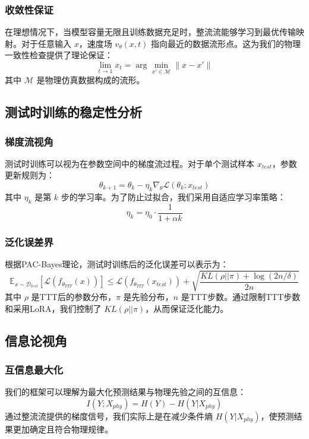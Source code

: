 \documentclass[12pt, a4paper]{article}
\begin{document}
\subsubsection{收敛性保证}
在理想情况下，当模型容量无限且训练数据充足时，整流流能够学习到最优传输映射。对于任意输入 $x$，速度场 $v_\theta(x,t)$ 指向最近的数据流形点。这为我们的物理一致性检查提供了理论保证：
\begin{equation}
\lim_{t \rightarrow 1} x_t = \arg\min_{x' \in \mathcal{M}} \|x - x'\|
\end{equation}
其中 $\mathcal{M}$ 是物理仿真数据构成的流形。

\subsection{测试时训练的稳定性分析}

\subsubsection{梯度流视角}
测试时训练可以视为在参数空间中的梯度流过程。对于单个测试样本 $x_{test}$，参数更新规则为：
\begin{equation}
\theta_{k+1} = \theta_k - \eta_k \nabla_\theta \mathcal{L}(\theta_k; x_{test})
\end{equation}
其中 $\eta_k$ 是第 $k$ 步的学习率。为了防止过拟合，我们采用自适应学习率策略：
\begin{equation}
\eta_k = \eta_0 \cdot \frac{1}{1 + \alpha k}
\end{equation}

\subsubsection{泛化误差界}
根据PAC-Bayes理论，测试时训练后的泛化误差可以表示为：
\begin{equation}
\mathbb{E}_{x \sim \mathcal{D}_{test}}[\mathcal{L}(f_{\theta_{TTT}}(x))] \leq \mathcal{L}(f_{\theta_{TTT}}(x_{test})) + \sqrt{\frac{KL(\rho || \pi) + \log(2n/\delta)}{2n}}
\end{equation}
其中 $\rho$ 是TTT后的参数分布，$\pi$ 是先验分布，$n$ 是TTT步数。通过限制TTT步数和采用LoRA，我们控制了 $KL(\rho || \pi)$，从而保证泛化能力。

\subsection{信息论视角}

\subsubsection{互信息最大化}
我们的框架可以理解为最大化预测结果与物理先验之间的互信息：
\begin{equation}
I(Y; X_{phy}) = H(Y) - H(Y|X_{phy})
\end{equation}
通过整流流提供的梯度信号，我们实际上是在减少条件熵 $H(Y|X_{phy})$，使预测结果更加确定且符合物理规律。
\end{document}
